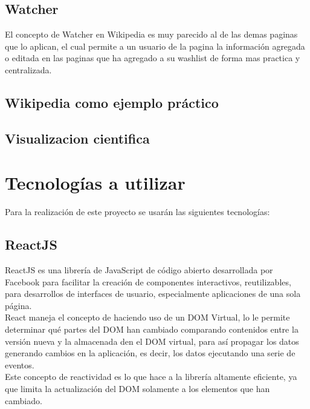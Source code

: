         
    \subsection{Watcher}

        El concepto de Watcher en Wikipedia es muy parecido al de las demas paginas que lo aplican, el cual permite a un usuario de la pagina  la información agregada o editada en las paginas que ha agregado a su washlist de forma mas practica y centralizada.
       
    \subsection{Wikipedia como ejemplo práctico}

    \subsection{Visualizacion cientifica}

    


\section{Tecnologías a utilizar}

    Para la realización de este proyecto se usarán las siguientes tecnologías:

    \subsection{ReactJS}

        ReactJS es una librería de JavaScript de código abierto desarrollada por Facebook para facilitar la creación de componentes interactivos, reutilizables, para desarrollos de interfaces de usuario, especialmente aplicaciones de una sola página.\\

        React maneja el concepto de  haciendo uso de un DOM Virtual, lo le permite determinar qué partes del DOM han cambiado comparando contenidos entre la versión nueva y la almacenada den el DOM virtual, para así propagar los datos generando cambios en la aplicación, es decir, los datos  ejecutando una serie de eventos.\\

        Este concepto de reactividad es lo que hace a la librería altamente eficiente, ya que limita la actualización del DOM solamente a los elementos que han cambiado.\\

